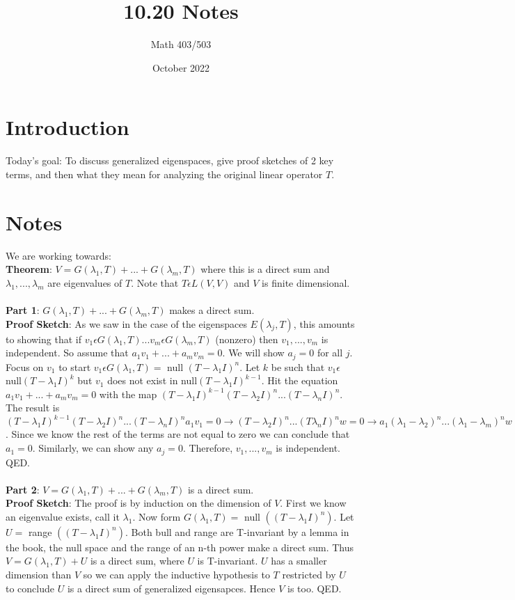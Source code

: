 \documentclass{article}
\title{10.20 Notes}
\author{Math 403/503}
\date{October 2022}
\begin{document}
\maketitle

\section{Introduction}
Today's goal: To discuss generalized eigenspaces, give proof sketches of 2 key terms, and then what they mean for analyzing the original linear operator $T$. 
\section{Notes} 
We are working towards: \\ \textbf{Theorem}: $V = G(\lambda_1, T) + ... + G(\lambda_m, T)$ where this is a direct sum and $\lambda_1, ..., \lambda_m$ are eigenvalues of $T$. Note that $T \epsilon L(V,V)$ and $V$ is finite dimensional. \\\\
\textbf{Part 1}: $G(\lambda_1, T) + ... + G(\lambda_m, T)$ makes a direct sum. \\
\textbf{Proof Sketch}: As we saw in the case of the eigenspaces $E(\lambda_j, T)$, this amounts to showing that if $v_1 \epsilon G(\lambda_1, T)...v_m \epsilon G(\lambda_m, T)$ (nonzero) then $v_1, ..., v_m$ is independent. So assume that $a_1v_1 + ...+a_mv_m = 0$. We will show $a_j = 0$ for all $j$. Focus on $v_1$ to start $v_1 \epsilon G(\lambda_1, T) =$ null $(T-\lambda_1 I)^n$. Let $k$ be such that $v_1 \epsilon$ null$(T-\lambda_1 I)^k$ but $v_1$ does not exist in null$(T-\lambda_1 I)^{k-1}$. Hit the equation $a_1v_1 + ...+a_mv_m = 0$ with the map $(T-\lambda_1 I)^{k-1}(T-\lambda_2 I)^n...(T-\lambda_n I)^n$. The result is $(T-\lambda_1 I)^{k-1}(T-\lambda_2 I)^n...(T-\lambda_n I)^na_1v_1 = 0 \rightarrow (T-\lambda_2 I)^n...(T\lambda_n I)^n w = 0 \rightarrow a_1(\lambda_1 -\lambda_2)^n...(\lambda_1-\lambda_m)^n w = 0$. Since we know the rest of the terms are not equal to zero we can conclude that $a_1 = 0$. Similarly, we can show any $a_j = 0$. Therefore, $v_1, ..., v_m$ is independent. QED. \\\\
\textbf{Part 2}: $V= G(\lambda_1, T) + ... + G(\lambda_m, T)$ is a direct sum. \\
\textbf{Proof Sketch}: The proof is by induction on the dimension of $V$. First we know an eigenvalue exists, call it $\lambda_1$. Now form $G(\lambda_1, T) =$ null $((T-\lambda_1 I)^n)$. Let $U=$ range $((T-\lambda_1 I)^n)$. Both bull and range are T-invariant by a lemma in the book, the null space and the range of an n-th power make a direct sum. Thus $V = G(\lambda_1, T) + U$ is a direct sum, where $U$ is T-invariant. $U$ has a smaller dimension than $V$ so we can apply the inductive hypothesis to $T$ restricted by $U$ to conclude $U$ is a direct sum of generalized eigensapces. Hence $V$ is too. QED. \\\\
\end{document}
